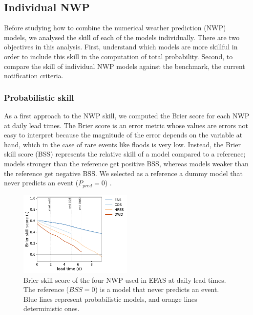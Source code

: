 \documentclass[preprint,12pt]{elsarticle}
\begin{document}
\subsection{Individual NWP}
\label{sec:results_NWP}

Before studying how to combine the numerical weather prediction (NWP) models, we analysed the skill of each of the models individually. There are two objectives in this analysis. First, understand which models are more skillful in order to include this skill in the computation of total probability. Second, to compare the skill  of individual NWP models against the benchmark, the current notification criteria.

\subsubsection{Probabilistic skill}
\label{sec:NWP_prob_skill}

As a first approach to the NWP skill, we computed the Brier score for each NWP at daily lead times. The Brier score is an error metric whose values are errors not easy to interpret because the magnitude of the error depends on the variable at hand, which in the case of rare events like floods is very low. Instead, the Brier skill score (BSS) represents the relative skill of a model compared to a reference; models stronger than the reference get positive BSS, whereas models weaker than the reference get negative BSS. We selected as a reference a dummy model that never predicts an event ($P_{pred}=0$) \cite{Legg2004}.

\begin{figure}
    \centering
    \includegraphics[width=0.5\textwidth]{figures/Brier_skill_score_5.pdf}
    \caption{Brier skill score of the four NWP used in EFAS at daily lead times. The reference ($BSS=0$) is a model that never predicts an event. Blue lines represent probabilistic models, and orange lines deterministic ones.}
    \label{fig:BSS}
\end{figure}
\end{document}
